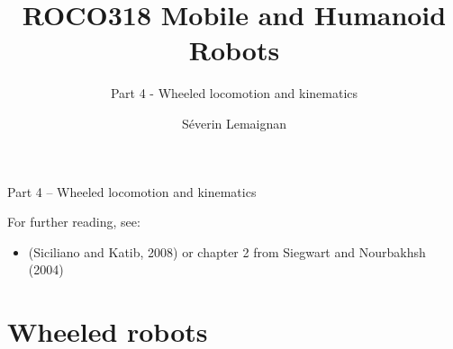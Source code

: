 \documentclass[compress]{beamer}
\title{ROCO318 \newline Mobile and Humanoid Robots}
\subtitle{Part 4 - Wheeled locomotion and kinematics}
\date{}
\author{Séverin Lemaignan}
\institute{Centre for Neural Systems and Robotics\\{\bf Plymouth University}}
\begin{document}

\maketitle

\begin{frame}{Part 4 -- Wheeled locomotion and kinematics}

For further reading, see:
    
    \begin{itemize}
        \item (Siciliano and Katib, 2008) or chapter 2 from Siegwart and
Nourbakhsh (2004)
    \end{itemize}
\end{frame}

\section{Wheeled robots}
\end{document}

